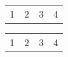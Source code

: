 \documentclass{article}
\begin{document}
\begin{tabularx}{6cm}{llXX}
  1 & 2 & 3 & 4 \\
\end{tabularx}

\begin{tabularx}{\linewidth}[pos]{llXX}
  1 & 2 & 3 & 4 \\
\end{tabularx}
\end{document}
